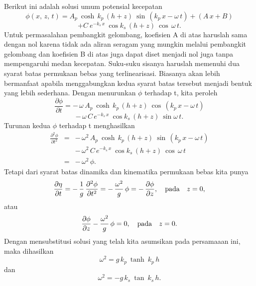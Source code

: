 \documentclass[12pt,a4paper]{report}
\begin{document}
Berikut ini adalah solusi umum potensial kecepatan
\[
\phi(x,\,z,\,t)=A_{p}\:\cosh \,k_{p}\,(h+z)\:\sin\,(k_{p}\,x-\omega\,
t)+(A\,x+B)
\]
\begin{equation}
+ C\:e^{-k_{s}\,x}\:\cos k_{s}\,(h+z)\:\cos \,\omega\, t.
\end{equation}
Untuk permasalahan pembangkit gelombang, koefisien A di atas haruslah sama
dengan nol karena tidak ada aliran seragam yang mungkin melalui pembangkit
gelombang dan koefisien B di atas juga dapat diset menjadi nol juga tanpa
mempengaruhi medan kecepatan. Suku-suku sisanya haruslah memenuhi dua syarat
batas permukaan bebas yang terlinearisasi. Biasanya akan lebih bermanfaat
apabila menggabungkan kedua syarat batas tersebut menjadi bentuk yang lebih
sederhana.\newline
Dengan menurunkan $\phi$ terhadap t, kita peroleh
\[
\frac{\partial\phi}{\partial t}=-\,\omega\, A_{p}\:\cosh\,
k_{p}\,(h+z)\:\cos\,(k_{p}\,x-\omega\, t)
\]
\begin{equation}
-\,\omega\, C\,e^{-k_{s}\,x}\:\cos k_{s}\,(h+z)\:\sin \omega\, t.
\end{equation}
Turunan kedua $\phi$ terhadap t menghasilkan
\begin{eqnarray}
\frac{\partial^2\phi}{\partial t^2} &=& -\,\omega^2\, A_{p}\:\cosh\,
k_{p}\,(h+z)\:\sin\,(k_{p}\,x-\omega\, t)  \nonumber \\
& & -\, \omega^2\, C\,e^{-k_{s}\,x}\:\cos k_{s}\,(h+z)\:\cos\, \omega\, t
\nonumber \\
&=& -\,\omega^2\,\phi.
\end{eqnarray}
Tetapi dari syarat batas dinamika dan kinematika permukaan bebas kita punya
\begin{equation}
\frac{\partial \eta}{\partial t}=-\,\frac{1}{g}\,\frac{\partial^2\phi}{%
\partial t^2}= -\,\frac{\omega^2}{g}\,\phi = -\,\frac{\partial \phi}{%
\partial z}, \quad \textmd{pada} \quad z = 0,
\end{equation}
atau
\begin{equation}
\frac{\partial \phi}{\partial z}-\frac{\omega^2}{g}\,\phi=0, \quad \textmd{pada} \quad z = 0.
\end{equation}
Dengan mensubstitusi solusi yang telah kita asumsikan pada persamaaan ini,
maka dihasilkan
\begin{equation}
\omega^2 = g\,k_{p}\: \tanh\: k_{p}\,h  \label{progresif}
\end{equation}
dan
\begin{equation}
\omega^2 = -g\,k_{s} \:\tan\: k_{s}\,h.  \label{berdiri}
\end{equation}
\end{document}

